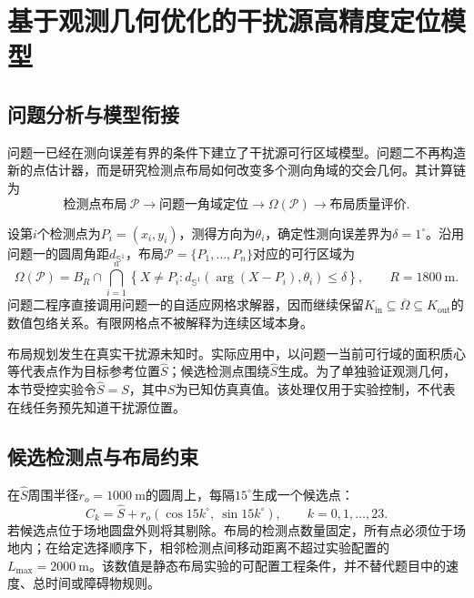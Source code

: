 
\section{基于观测几何优化的干扰源高精度定位模型}

\subsection{问题分析与模型衔接}

问题一已经在测向误差有界的条件下建立了干扰源可行区域模型。问题二不再构造新的点估计器，而是研究检测点布局如何改变多个测向角域的交会几何。其计算链为
\begin{equation}
  \text{检测点布局}\ \mathcal P
  \longrightarrow \text{问题一角域定位}
  \longrightarrow \Omega(\mathcal P)
  \longrightarrow \text{布局质量评价}.
  \label{eq:p2-chain}
\end{equation}

设第$i$个检测点为$P_i=(x_i,y_i)$，测得方向为$\theta_i$，确定性测向误差界为$\delta=1^\circ$。沿用问题一的圆周角距$d_{\mathbb S^1}$，布局$\mathcal P=\{P_1,\ldots,P_n\}$对应的可行区域为
\begin{equation}
  \Omega(\mathcal P)=B_R\cap\bigcap_{i=1}^{n}
  \left\{X\ne P_i:
  d_{\mathbb S^1}\!\left(\arg(X-P_i),\theta_i\right)\le\delta\right\},
  \qquad R=1800\ \mathrm m.
  \label{eq:p2-region}
\end{equation}
问题二程序直接调用问题一的自适应网格求解器，因而继续保留$K_{\mathrm{in}}\subseteq\overline\Omega\subseteq K_{\mathrm{out}}$的数值包络关系。有限网格点不被解释为连续区域本身。

布局规划发生在真实干扰源未知时。实际应用中，以问题一当前可行域的面积质心等代表点作为目标参考位置$\widehat S$；候选检测点围绕$\widehat S$生成。为了单独验证观测几何，本节受控实验令$\widehat S=S$，其中$S$为已知仿真真值。该处理仅用于实验控制，不代表在线任务预先知道干扰源位置。

\subsection{候选检测点与布局约束}

在$\widehat S$周围半径$r_o=1000\ \mathrm m$的圆周上，每隔$15^\circ$生成一个候选点：
\begin{equation}
  C_k=\widehat S+r_o
  \left(\cos 15k^\circ,\ \sin 15k^\circ\right),
  \qquad k=0,1,\ldots,23.
  \label{eq:p2-candidates}
\end{equation}
若候选点位于场地圆盘外则将其剔除。布局的检测点数量固定，所有点必须位于场地内；在给定选择顺序下，相邻检测点间移动距离不超过实验配置的$L_{\max}=2000\ \mathrm m$。该数值是静态布局实验的可配置工程条件，并不替代题目中的速度、总时间或障碍物规则。

